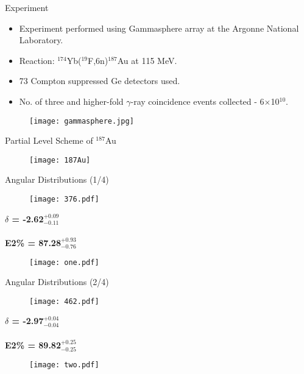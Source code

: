\documentclass [aspectratio=169]{beamer}
\begin{document}
\begin{frame}{Experiment}
\begin{multicols}{2}
\begin{itemize}
\item{Experiment performed using Gammasphere array at the Argonne National Laboratory.}
\item{Reaction: $^{174}$Yb($^{19}$F,6n)$^{187}$Au at 115 MeV.}
\item{73 Compton suppressed Ge detectors used.}
\item{No. of three and higher-fold $\gamma$-ray coincidence events collected - 6$\times$10$^{10}$.}
\end{itemize}
\begin{figure}
\texttt{[image: gammasphere.jpg]}
\end{figure}
\end{multicols}
\end{frame}


\begin{frame}{Partial Level Scheme of $^{187}$Au}
\begin{figure}
\texttt{[image: 187Au]}
\end{figure}
\end{frame}


\begin{frame}{Angular Distributions (1/4)}
\begin{center}
\begin{multicols}{2}
\begin{figure}
\texttt{[image: 376.pdf]}
\end{figure}
\textbf{$\delta$ = -2.62$^{+0.09}_{-0.11}$ \\~\\
E2\% = 87.28$^{+0.93}_{-0.76}$} \\
\begin{figure}
\texttt{[image: one.pdf]}
\end{figure}
\end{multicols}
\end{center}
\end{frame}


\begin{frame}{Angular Distributions (2/4)}
\begin{center}
\begin{multicols}{2}
\begin{figure}
\texttt{[image: 462.pdf]}
\end{figure}
\textbf{$\delta$ = -2.97$^{+0.04}_{-0.04}$ \\~\\
E2\% = 89.82$^{+0.25}_{-0.25}$} \\
\begin{figure}
\texttt{[image: two.pdf]}
\end{figure}
\end{multicols}
\end{center}
\end{frame}
\end{document}
